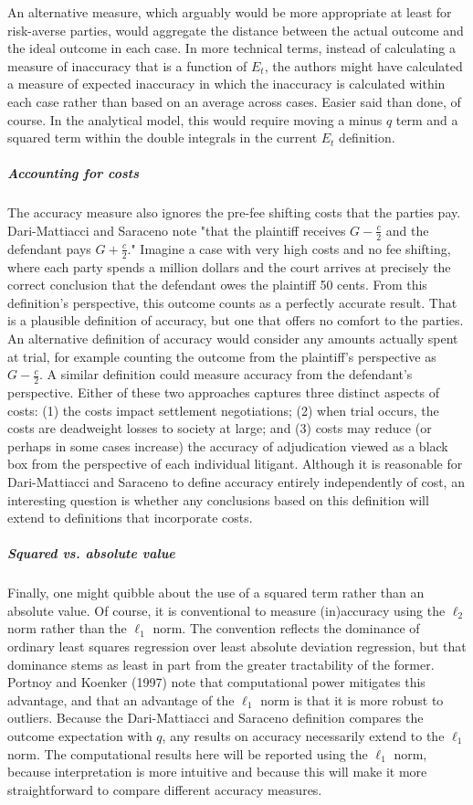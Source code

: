 \documentclass{article}
\begin{document}
An alternative measure, which arguably would be more appropriate at least for risk-averse parties, would aggregate the distance between the actual outcome and the ideal outcome in each case. In more technical terms, instead of calculating a measure of inaccuracy that is a function of $E_t$, the authors might have calculated a measure of expected inaccuracy in which the inaccuracy is calculated within each case rather than based on an average across cases. Easier said than done, of course. In the analytical model, this would require moving a minus $q$ term and a squared term within the double integrals in the current $E_t$ definition. 

\subparagraph{Accounting for costs}The accuracy measure also ignores the pre-fee shifting costs that the parties pay. Dari-Mattiacci and Saraceno note "that the plaintiff receives $G - \frac{c}{2}$ and the defendant pays $G + \frac{c}{2}$." Imagine a case with very high costs and no fee shifting, where each party spends a million dollars and the court arrives at precisely the correct conclusion that the defendant owes the plaintiff 50 cents. From this definition's perspective, this outcome counts as a perfectly accurate result. That is a plausible definition of accuracy, but one that offers no comfort to the parties. An alternative definition of accuracy would consider any amounts actually spent at trial, for example counting the outcome from the plaintiff's perspective as $G - \frac{c}{2}$. A similar definition could measure accuracy from the defendant's perspective. Either of these two approaches captures three distinct aspects of costs: (1) the costs impact settlement negotiations; (2) when trial occurs, the costs are deadweight losses to society at large; and (3) costs may reduce (or perhaps in some cases increase) the accuracy of adjudication viewed as a black box from the perspective of each individual litigant. Although it is reasonable for Dari-Mattiacci and Saraceno to define accuracy entirely independently of cost, an interesting question is whether any conclusions based on this definition will extend to definitions that incorporate costs.

\subparagraph{Squared vs. absolute value}Finally, one might quibble about the use of a squared term rather than an absolute value. Of course, it is conventional to measure (in)accuracy using the $\ell_2$ norm rather than the $\ell_1$ norm. The convention reflects the dominance of ordinary least squares regression over least absolute deviation regression, but that dominance stems as least in part from the greater tractability of the former. Portnoy and Koenker (1997) \cite{portnoykoenker} note that computational power mitigates this advantage, and that an advantage of the $\ell_1$ norm is that it is more robust to outliers. Because the Dari-Mattiacci and Saraceno definition compares the outcome expectation with $q$, any results on accuracy necessarily extend to the $\ell_1$ norm. The computational results here will be reported using the $\ell_1$ norm, because interpretation is more intuitive and because this will make it more straightforward to compare different accuracy measures.
\end{document}
